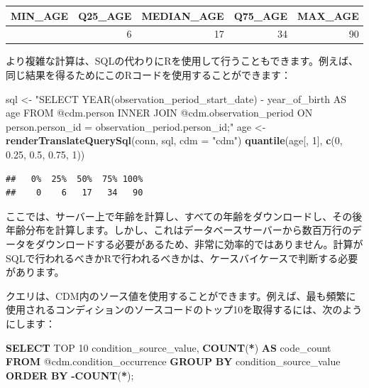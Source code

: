 \documentclass[
  11pt]{book}
\newenvironment{Shaded}{\begin{snugshade}}{\end{snugshade}}
\newcommand{\AttributeTok}[1]{\textcolor[rgb]{0.13,0.29,0.53}{#1}}
\newcommand{\DecValTok}[1]{\textcolor[rgb]{0.00,0.00,0.81}{#1}}
\newcommand{\FloatTok}[1]{\textcolor[rgb]{0.00,0.00,0.81}{#1}}
\newcommand{\FunctionTok}[1]{\textcolor[rgb]{0.13,0.29,0.53}{\textbf{#1}}}
\newcommand{\KeywordTok}[1]{\textcolor[rgb]{0.13,0.29,0.53}{\textbf{#1}}}
\newcommand{\NormalTok}[1]{#1}
\newcommand{\OperatorTok}[1]{\textcolor[rgb]{0.81,0.36,0.00}{\textbf{#1}}}
\newcommand{\OtherTok}[1]{\textcolor[rgb]{0.56,0.35,0.01}{#1}}
\newcommand{\StringTok}[1]{\textcolor[rgb]{0.31,0.60,0.02}{#1}}
\theoremstyle{definition}
\theoremstyle{definition}
\theoremstyle{definition}
\theoremstyle{definition}
\theoremstyle{remark}
\begin{document}
\begin{longtable}[]{@{}rrrrr@{}}
\toprule\noalign{}
MIN\_AGE & Q25\_AGE & MEDIAN\_AGE & Q75\_AGE & MAX\_AGE \\
\midrule\noalign{}
\endhead
\bottomrule\noalign{}
\endlastfoot
0 & 6 & 17 & 34 & 90 \\
\end{longtable}

より複雑な計算は、SQLの代わりにRを使用して行うこともできます。例えば、同じ結果を得るためにこのRコードを使用することができます：

\begin{Shaded}
\begin{Highlighting}[]
\NormalTok{sql }\OtherTok{\textless{}{-}} \StringTok{"SELECT YEAR(observation\_period\_start\_date) {-}}
\StringTok{               year\_of\_birth AS age}
\StringTok{FROM @cdm.person}
\StringTok{INNER JOIN @cdm.observation\_period}
\StringTok{  ON person.person\_id = observation\_period.person\_id;"}
\NormalTok{age }\OtherTok{\textless{}{-}} \FunctionTok{renderTranslateQuerySql}\NormalTok{(conn, sql, }\AttributeTok{cdm =} \StringTok{"cdm"}\NormalTok{)}
\FunctionTok{quantile}\NormalTok{(age[, }\DecValTok{1}\NormalTok{], }\FunctionTok{c}\NormalTok{(}\DecValTok{0}\NormalTok{, }\FloatTok{0.25}\NormalTok{, }\FloatTok{0.5}\NormalTok{, }\FloatTok{0.75}\NormalTok{, }\DecValTok{1}\NormalTok{))}
\end{Highlighting}
\end{Shaded}

\begin{verbatim}
##   0%  25%  50%  75% 100%
##    0    6   17   34   90
\end{verbatim}

ここでは、サーバー上で年齢を計算し、すべての年齢をダウンロードし、その後年齢分布を計算します。しかし、これはデータベースサーバーから数百万行のデータをダウンロードする必要があるため、非常に効率的ではありません。計算がSQLで行われるべきかRで行われるべきかは、ケースバイケースで判断する必要があります。

クエリは、CDM内のソース値を使用することができます。例えば、最も頻繁に使用されるコンディションのソースコードのトップ10を取得するには、次のようにします：

\begin{Shaded}
\begin{Highlighting}[]
\KeywordTok{SELECT}\NormalTok{ TOP }\DecValTok{10}\NormalTok{ condition\_source\_value,}
  \FunctionTok{COUNT}\NormalTok{(}\OperatorTok{*}\NormalTok{) }\KeywordTok{AS}\NormalTok{ code\_count}
\KeywordTok{FROM}\NormalTok{ @cdm.condition\_occurrence}
\KeywordTok{GROUP} \KeywordTok{BY}\NormalTok{ condition\_source\_value}
\KeywordTok{ORDER} \KeywordTok{BY} \OperatorTok{{-}}\FunctionTok{COUNT}\NormalTok{(}\OperatorTok{*}\NormalTok{);}
\end{Highlighting}
\end{Shaded}
\end{document}
